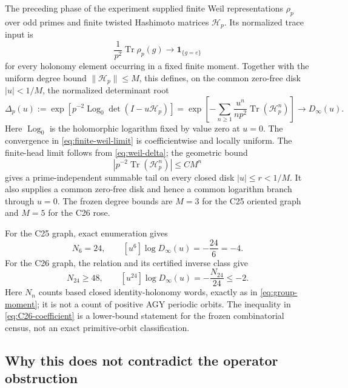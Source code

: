 The preceding phase of the experiment supplied finite Weil representations
$\rho_p$ over odd primes and finite twisted Hashimoto matrices $\mathcal H_p$.
Its normalized trace input is
\begin{equation}
 \frac{1}{p^2}\operatorname{Tr}\rho_p(g)
 \longrightarrow \mathbf 1_{\{g=e\}}
 \label{eq:weil-delta}
\end{equation}
for every holonomy element occurring in a fixed finite moment.  Together with
the uniform degree bound $\|\mathcal H_p\|\leq M$, this defines, on the common
zero-free disk $|u|<1/M$, the normalized determinant root
\begin{equation}
 \Delta_p(u):=
 \exp\!\left[p^{-2}\operatorname{Log}_0
       \det(I-u\mathcal H_p)\right]
 =
 \exp\!\left[-\sum_{n\geq1}
   \frac{u^n}{np^2}\operatorname{Tr}(\mathcal H_p^n)\right]
 \longrightarrow D_\infty(u).
 \label{eq:finite-weil-limit}
\end{equation}
Here $\operatorname{Log}_0$ is the holomorphic logarithm fixed by value zero
at $u=0$.  The convergence in \eqref{eq:finite-weil-limit} is coefficientwise
and locally uniform.
The finite-head limit follows from \eqref{eq:weil-delta}; the geometric bound
\[
 \left|p^{-2}\operatorname{Tr}(\mathcal H_p^n)\right|\leq CM^n
\]
gives a prime-independent summable tail on every closed disk
$|u|\leq r<1/M$.  It also supplies a common zero-free disk and hence a common
logarithm branch through $u=0$.  The frozen degree bounds are $M=3$ for the
C25 oriented graph and $M=5$ for the C26 rose.

For the C25 graph, exact enumeration gives
\begin{equation}
 N_6=24,\qquad
 [u^6]\log D_\infty(u)=-\frac{24}{6}=-4.
 \label{eq:C25-coefficient}
\end{equation}
For the C26 graph, the relation and its certified inverse class give
\begin{equation}
 N_{24}\geq48,\qquad
 [u^{24}]\log D_\infty(u)=-\frac{N_{24}}{24}\leq-2.
 \label{eq:C26-coefficient}
\end{equation}
Here $N_n$ counts based closed identity-holonomy words, exactly as in
\eqref{eq:group-moment}; it is not a count of positive AGY periodic orbits.
The inequality in \eqref{eq:C26-coefficient} is a lower-bound statement for
the frozen combinatorial census, not an exact primitive-orbit
classification.

\subsection{Why this does not contradict the operator obstruction}

